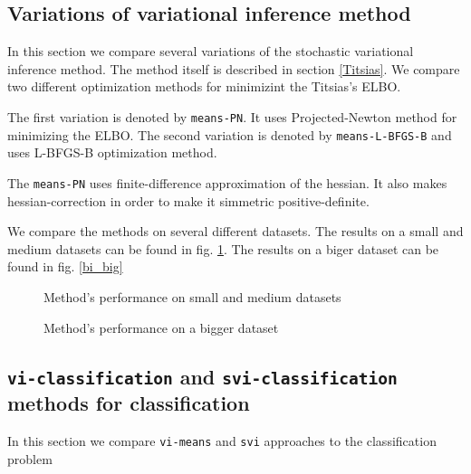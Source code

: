 \subsection{Variations of variational inference method}
	In this section we compare several variations of the stochastic variational inference method. The method itself is described in section \ref{Titsias}. We compare two different optimization methods for minimizint the Titsias's ELBO.

	The first variation is denoted by \lstinline{means-PN}. It uses Projected-Newton method for minimizing the ELBO. The second variation is denoted by \lstinline{means-L-BFGS-B} and uses L-BFGS-B optimization method.

	The \lstinline{means-PN} uses finite-difference approximation of the hessian. It also makes hessian-correction in order to make it simmetric positive-definite.

	We compare the methods on several different datasets. The results on a small and medium datasets can be found in fig. \ref{vi_small}. The results on a biger dataset can be found in fig. \ref{bi_big}

	\begin{figure}[!h]
		\centering
		\subfloat{
			\scalebox{0.75}{
				
			}
		}
		\subfloat{
			\scalebox{0.75}{
	    		
			}
		}

		\label{vi_small}
		\caption{Method's performance on small and medium datasets}
	\end{figure}
	\begin{figure}[!h]
		\centering
		\subfloat{
			\scalebox{0.75}{
				
			}
		}
		\subfloat{
			\scalebox{0.75}{
				
			}
		}
		\label{vi_big}
		\caption{Method's performance on a bigger dataset}
	\end{figure}

\subsection{\lstinline{vi-classification} and \lstinline{svi-classification} methods for classification}
	In this section we compare \lstinline{vi-means} and \lstinline{svi} approaches to the classification problem